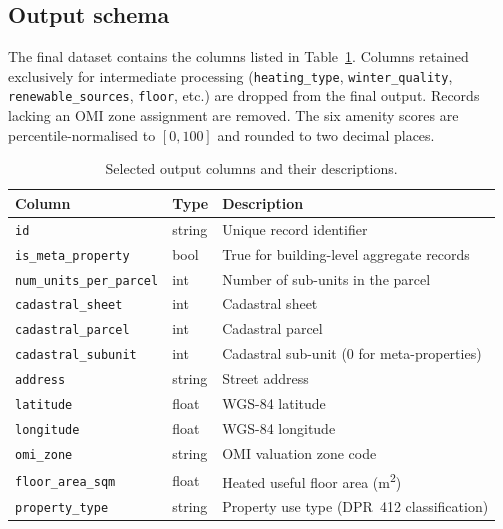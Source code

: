 \documentclass[runningheads,orivec]{llncs}
\begin{document}
\subsection{Output schema}
\label{sec:output}

The final dataset contains the columns listed in
Table~\ref{tab:schema}. Columns retained exclusively for intermediate processing
(\texttt{heating\_type}, \texttt{winter\_quality}, \\ \texttt{renewable\_sources},
\texttt{floor}, etc.) are dropped from the final output.
Records lacking an OMI zone assignment are removed.
The six amenity scores are \\ percentile-normalised to
$[0, 100]$ and rounded to two decimal places.

\begin{table}[h]
\centering
\caption{Selected output columns and their descriptions.}
\label{tab:schema}
\begin{tabularx}{\textwidth}{llX}
\toprule
\textbf{Column} & \textbf{Type} & \textbf{Description} \\
\midrule
\texttt{id}                         & string  & Unique record identifier \\
\texttt{is\_meta\_property}          & bool    & True for building-level aggregate records \\
\texttt{num\_units\_per\_parcel}      & int     & Number of sub-units in the parcel \\
\texttt{cadastral\_sheet}            & int     & Cadastral sheet \\
\texttt{cadastral\_parcel}           & int     & Cadastral parcel \\
\texttt{cadastral\_subunit}          & int     & Cadastral sub-unit (0 for meta-properties) \\
\texttt{address}                    & string  & Street address \\
\texttt{latitude}                   & float   & WGS-84 latitude \\
\texttt{longitude}                  & float   & WGS-84 longitude \\
\texttt{omi\_zone}                   & string  & OMI valuation zone code \\
\texttt{floor\_area\_sqm}            & float   & Heated useful floor area (m\textsuperscript{2}) \\
\texttt{property\_type}             & string  & Property use type (DPR~412 classification) \\

\end{tabularx}
\end{table}
\end{document}
